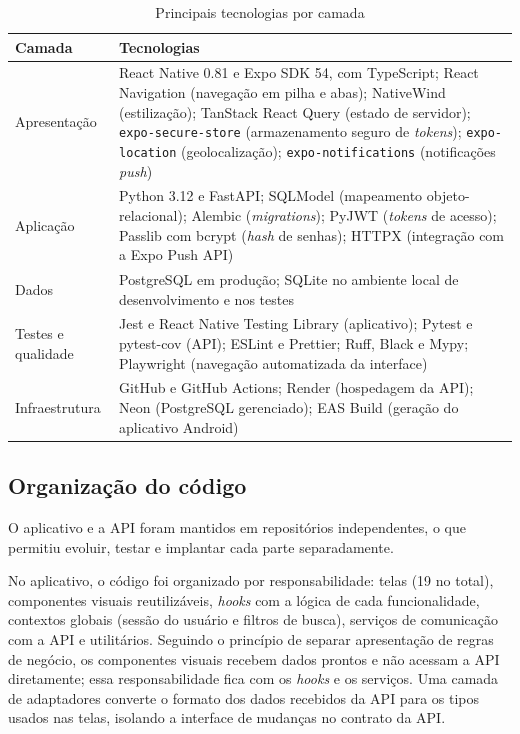 \documentclass[a4paper, 12pt]{article}
\begin{document}
\begin{justify}
\begin{table}[H]
\centering
\caption{Principais tecnologias por camada}
\label{tab:stack}
\small
\begin{tabular}{|p{3.4cm}|p{10.6cm}|}
\hline
\textbf{Camada} & \textbf{Tecnologias} \\
\hline
Apresentação & React Native 0.81 e Expo SDK 54, com TypeScript; React Navigation (navegação em pilha e abas); NativeWind (estilização); TanStack React Query (estado de servidor); \texttt{expo-secure-store} (armazenamento seguro de \textit{tokens}); \texttt{expo-location} (geolocalização); \texttt{expo-notifications} (notificações \textit{push}) \\
\hline
Aplicação & Python 3.12 e FastAPI; SQLModel (mapeamento objeto-relacional); Alembic (\textit{migrations}); PyJWT (\textit{tokens} de acesso); Passlib com bcrypt (\textit{hash} de senhas); HTTPX (integração com a Expo Push API) \\
\hline
Dados & PostgreSQL em produção; SQLite no ambiente local de desenvolvimento e nos testes \\
\hline
Testes e qualidade & Jest e React Native Testing Library (aplicativo); Pytest e pytest-cov (API); ESLint e Prettier; Ruff, Black e Mypy; Playwright (navegação automatizada da interface) \\
\hline
Infraestrutura & GitHub e GitHub Actions; Render (hospedagem da API); Neon (PostgreSQL gerenciado); EAS Build (geração do aplicativo Android) \\
\hline
\end{tabular}
\end{table}

\subsection{Organização do código}

O aplicativo e a API foram mantidos em repositórios independentes, o que permitiu evoluir, testar e implantar cada parte separadamente.

No aplicativo, o código foi organizado por responsabilidade: telas (19 no total), componentes visuais reutilizáveis, \textit{hooks} com a lógica de cada funcionalidade, contextos globais (sessão do usuário e filtros de busca), serviços de comunicação com a API e utilitários. Seguindo o princípio de separar apresentação de regras de negócio, os componentes visuais recebem dados prontos e não acessam a API diretamente; essa responsabilidade fica com os \textit{hooks} e os serviços. Uma camada de adaptadores converte o formato dos dados recebidos da API para os tipos usados nas telas, isolando a interface de mudanças no contrato da API.


\end{justify}
\end{document}

